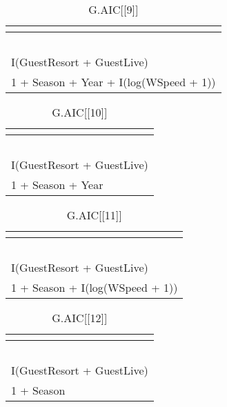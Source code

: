 %
\begin{table}[!tbp]
\caption{G.AIC[[9]]\label{G.AIC[[9]]}} 
\begin{center}
\begin{tabular}{l}
\hline\hline
\multicolumn{1}{c}{}\tabularnewline
\hline
~\tabularnewline
I(GuestResort + GuestLive)\tabularnewline
1 + Season + Year + I(log(WSpeed + 1))\tabularnewline
\hline
\end{tabular}
\end{center}
\end{table}

%
\begin{table}[!tbp]
\caption{G.AIC[[10]]\label{G.AIC[[10]]}} 
\begin{center}
\begin{tabular}{l}
\hline\hline
\multicolumn{1}{c}{}\tabularnewline
\hline
~\tabularnewline
I(GuestResort + GuestLive)\tabularnewline
1 + Season + Year\tabularnewline
\hline
\end{tabular}
\end{center}
\end{table}

%
\begin{table}[!tbp]
\caption{G.AIC[[11]]\label{G.AIC[[11]]}} 
\begin{center}
\begin{tabular}{l}
\hline\hline
\multicolumn{1}{c}{}\tabularnewline
\hline
~\tabularnewline
I(GuestResort + GuestLive)\tabularnewline
1 + Season + I(log(WSpeed + 1))\tabularnewline
\hline
\end{tabular}
\end{center}
\end{table}

%
\begin{table}[!tbp]
\caption{G.AIC[[12]]\label{G.AIC[[12]]}} 
\begin{center}
\begin{tabular}{l}
\hline\hline
\multicolumn{1}{c}{}\tabularnewline
\hline
~\tabularnewline
I(GuestResort + GuestLive)\tabularnewline
1 + Season\tabularnewline
\hline
\end{tabular}
\end{center}
\end{table}

